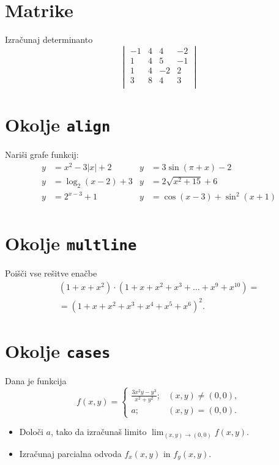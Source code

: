 \documentclass[a4paper,12pt]{article}
\begin{document}
\section*{Matrike}
Izračunaj determinanto
\[
\begin{vmatrix}
 -1 & 4 & 4 & -2 \\
 1 & 4 & 5 & -1 \\
 1 & 4 & -2 & 2 \\
 3 & 8 & 4 & 3 \\
\end{vmatrix}
\]

\section*{Okolje \texttt{align}}
Nariši grafe funkcij:
\begin{align*}
 y &= x^2 - 3|x| + 2  &  y &= 3 \sin(\pi+x) - 2 \\
 y &= \log_2(x-2) + 3 &  y &= 2 \sqrt{x^2+15} + 6 \\
 y &= 2^{x-3} + 1    &   y &= \cos(x-3) + \sin^2(x+1) \\
\end{align*}

\section*{Okolje \texttt{multline}}
Poišči vse rešitve enačbe
\begin{multline*}
(1+x+x^2) \cdot (1+x+x^2+x^3+\ldots+x^9+x^{10}) = \\
=(1+x+x^2+x^3+x^4+x^5+x^6)^2.
\end{multline*}

\section*{Okolje \texttt{cases}}
Dana je funkcija
\[
f(x,y) = \begin{cases}
    \frac{3x^2y-y^3}{x^2+y^2}; & (x,y) \neq (0,0), \\
      a; & (x,y) = (0,0). 
\end{cases}
\]

\begin{itemize}
\item Določi \(a\), tako da izračunaš limito \( \lim_{(x,y)\to(0,0)} f(x,y) \).
\item Izračunaj parcialna odvoda \(f_x(x,y)\) in \(f_y(x,y)\).
\end{itemize}
\end{document}
